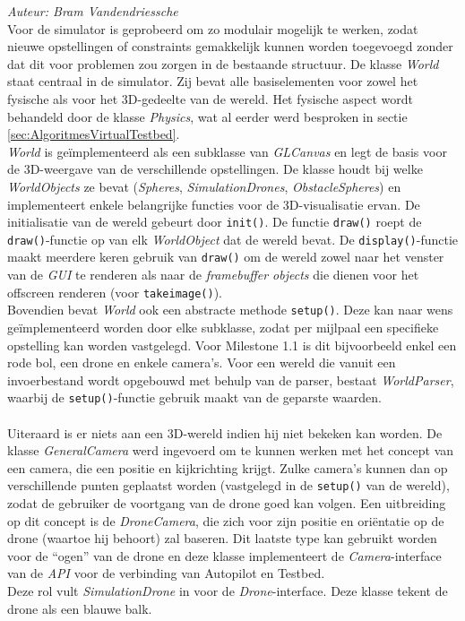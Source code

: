 {\em Auteur: Bram Vandendriessche}
\\

\noindent
Voor de simulator is geprobeerd om zo modulair mogelijk te werken, zodat nieuwe opstellingen of constraints gemakkelijk kunnen worden toegevoegd zonder dat dit voor problemen zou zorgen in de bestaande structuur. De klasse \textit{World} staat centraal in de simulator. Zij bevat alle basiselementen voor zowel het fysische als voor het 3D-gedeelte van de wereld. Het fysische aspect wordt behandeld door de klasse \textit{Physics}, wat al eerder werd besproken in sectie \ref{sec:AlgoritmesVirtualTestbed}. 
\\

\noindent
\textit{World} is ge\"implementeerd als een subklasse van \textit{GLCanvas} en legt de basis voor de 3D-weergave van de verschillende opstellingen. 
De klasse houdt bij welke \textit{WorldObjects} ze bevat (\textit{Spheres}, \textit{SimulationDrones}, \textit{ObstacleSpheres}) en implementeert enkele belangrijke functies voor de 3D-visualisatie ervan. De initialisatie van de wereld gebeurt door \texttt{init()}. De functie \texttt{draw()} roept de \texttt{draw()}-functie op van elk \textit{WorldObject} dat de wereld bevat. De \texttt{display()}-functie maakt meerdere keren gebruik van \texttt{draw()} om de wereld zowel naar het venster van de \textit{GUI} te renderen als naar de \textit{framebuffer objects} die dienen voor het offscreen renderen (voor \texttt{takeimage()}).\\
Bovendien bevat \textit{World} ook een abstracte methode \texttt{setup()}. Deze kan naar wens ge\"implementeerd worden door elke subklasse, zodat per mijlpaal een specifieke opstelling kan worden vastgelegd. Voor Milestone 1.1 is dit bijvoorbeeld enkel een rode bol, een drone en enkele camera's. Voor een wereld die vanuit een invoerbestand wordt opgebouwd met behulp van de parser, bestaat \textit{WorldParser}, waarbij de \texttt{setup()}-functie gebruik maakt van de geparste waarden.\\
\\
Uiteraard is er niets aan een 3D-wereld indien hij niet bekeken kan worden. De klasse \textit{GeneralCamera} werd ingevoerd om te kunnen werken met het concept van een camera, die een positie en kijkrichting krijgt. Zulke camera's kunnen dan op verschillende punten geplaatst worden (vastgelegd in de \texttt{setup()} van de wereld), zodat de gebruiker de voortgang van de drone goed kan volgen. Een uitbreiding op dit concept is de \textit{DroneCamera}, die zich voor zijn positie en ori\"entatie op de drone (waartoe hij behoort) zal baseren. Dit laatste type kan gebruikt worden voor de ``ogen'' van de drone en deze klasse implementeert de \textit{Camera}-interface van de \textit{API} voor de verbinding van Autopilot en Testbed.\\
Deze rol vult \textit{SimulationDrone} in voor de \textit{Drone}-interface. Deze klasse tekent de drone als een blauwe balk.

